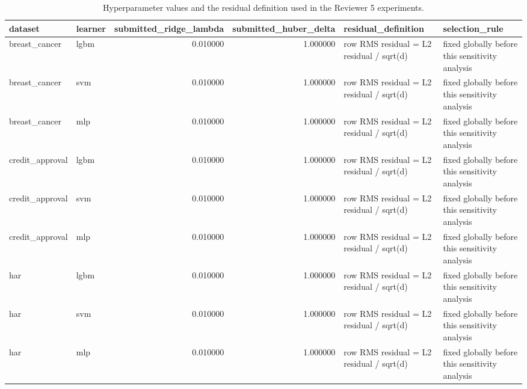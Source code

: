 \begin{table}[t]
\caption{Hyperparameter values and the residual definition used in the Reviewer 5 experiments.}
\label{tab:r5_final_hyperparameters_used}
\begin{tabular}{llrrll}
\toprule
dataset & learner & submitted_ridge_lambda & submitted_huber_delta & residual_definition & selection_rule \\
\midrule
breast_cancer & lgbm & 0.010000 & 1.000000 & row RMS residual = L2 residual / sqrt(d) & fixed globally before this sensitivity analysis \\
breast_cancer & svm & 0.010000 & 1.000000 & row RMS residual = L2 residual / sqrt(d) & fixed globally before this sensitivity analysis \\
breast_cancer & mlp & 0.010000 & 1.000000 & row RMS residual = L2 residual / sqrt(d) & fixed globally before this sensitivity analysis \\
credit_approval & lgbm & 0.010000 & 1.000000 & row RMS residual = L2 residual / sqrt(d) & fixed globally before this sensitivity analysis \\
credit_approval & svm & 0.010000 & 1.000000 & row RMS residual = L2 residual / sqrt(d) & fixed globally before this sensitivity analysis \\
credit_approval & mlp & 0.010000 & 1.000000 & row RMS residual = L2 residual / sqrt(d) & fixed globally before this sensitivity analysis \\
har & lgbm & 0.010000 & 1.000000 & row RMS residual = L2 residual / sqrt(d) & fixed globally before this sensitivity analysis \\
har & svm & 0.010000 & 1.000000 & row RMS residual = L2 residual / sqrt(d) & fixed globally before this sensitivity analysis \\
har & mlp & 0.010000 & 1.000000 & row RMS residual = L2 residual / sqrt(d) & fixed globally before this sensitivity analysis \\
\bottomrule
\end{tabular}
\end{table}
